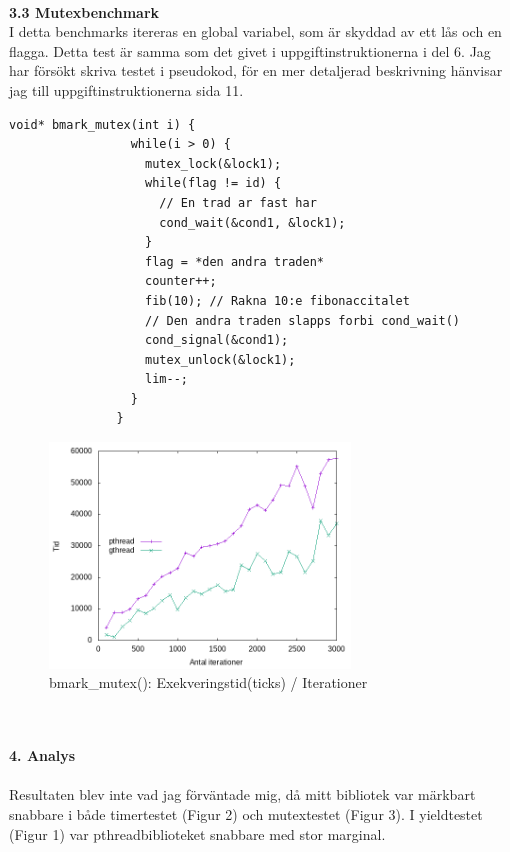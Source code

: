 \documentclass[a4paper,10pt]{article}
\begin{document}
         \maketitle
         \textbf
             {\\3.3 Mutexbenchmark\\}
             I detta benchmarks itereras en global variabel, som är skyddad av ett lås och en flagga. Detta test är samma som det givet i uppgiftinstruktionerna i del 6. Jag har försökt skriva testet i pseudokod, för en mer detaljerad beskrivning hänvisar jag till uppgiftinstruktionerna sida 11.
             \begin{lstlisting}[style=CStyle]
               void* bmark_mutex(int i) {         
                 while(i > 0) {
                   mutex_lock(&lock1);
                   while(flag != id) {
                     // En trad ar fast har
                     cond_wait(&cond1, &lock1);
                   }
                   flag = *den andra traden*
                   counter++;
                   fib(10); // Rakna 10:e fibonaccitalet
                   // Den andra traden slapps forbi cond_wait()
                   cond_signal(&cond1);
                   mutex_unlock(&lock1);
                   lim--;
                 }
               }
             \end{lstlisting}
             
             
        \begin{figure}[htp]
          \centering
          \includegraphics[width=8cm]{benchmarks/mutextest.png}
          \caption{bmark\_mutex(): Exekveringstid(ticks) / Iterationer}
          \label{fig:Graph}
        \end{figure}
        
        
        
\maketitle
\textbf
    {\\\\4. Analys\\\\}
    Resultaten blev inte vad jag förväntade mig, då mitt bibliotek var märkbart snabbare i både timertestet (Figur 2)  och mutextestet (Figur 3). I yieldtestet (Figur 1) var pthreadbiblioteket snabbare med stor marginal.\\\\
    
\end{document}
